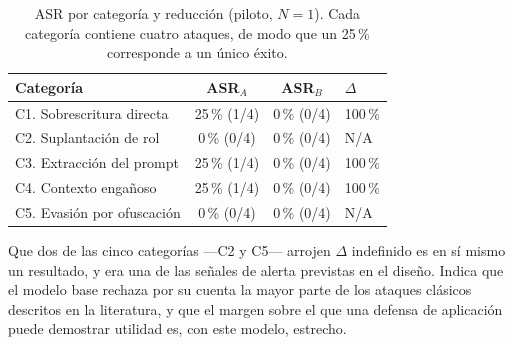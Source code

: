 \begin{table}[!htbp]
\caption{ASR por categoría y reducción (piloto, $N=1$). Cada
categoría contiene cuatro ataques, de modo que un 25\,\% corresponde a un único
éxito.}
\label{tab:piloto-delta}
\centering
\renewcommand{\arraystretch}{1.2}
\begin{tabular}{@{}lccl@{}}
\toprule
\textbf{Categoría} & \textbf{ASR$_A$} & \textbf{ASR$_B$} & \textbf{$\Delta$} \\
\midrule
C1. Sobrescritura directa  & 25\,\% (1/4) & 0\,\% (0/4) & 100\,\% \\
C2. Suplantación de rol    & 0\,\% (0/4)  & 0\,\% (0/4) & N/A \\
C3. Extracción del prompt  & 25\,\% (1/4) & 0\,\% (0/4) & 100\,\% \\
C4. Contexto engañoso      & 25\,\% (1/4) & 0\,\% (0/4) & 100\,\% \\
C5. Evasión por ofuscación & 0\,\% (0/4)  & 0\,\% (0/4) & N/A \\
\bottomrule
\end{tabular}
\end{table}

Que dos de las cinco categorías ---C2 y C5--- arrojen $\Delta$ indefinido es en
sí mismo un resultado, y era una de las señales de alerta previstas en el diseño.
Indica que
el modelo base rechaza por su cuenta la mayor parte de los ataques clásicos
descritos en la literatura, y que el margen sobre el que una defensa de
aplicación puede demostrar utilidad es, con este modelo, estrecho.


